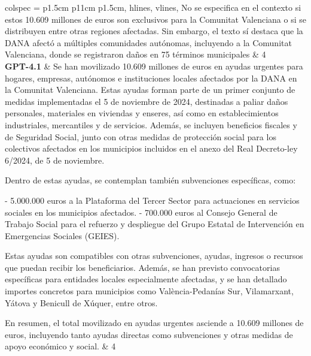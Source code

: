\begin{table}[H]
\begin{tblr}{
    				colspec = {p{1.5cm} p{11cm} p{1.5cm}},
    				hlines,
    				vlines,
    			}
    			 No se especifica en el contexto si estos 10.609 millones de euros son exclusivos para la Comunitat Valenciana o si se distribuyen entre otras regiones afectadas. Sin embargo, el texto sí destaca que la DANA afectó a múltiples comunidades autónomas, incluyendo a la Comunitat Valenciana, donde se registraron daños en 75 términos municipales & 4 \\   
    			 \textbf{GPT-4.1} & Se han movilizado 10.609 millones de euros en ayudas urgentes para hogares, empresas, autónomos e instituciones locales afectados por la DANA en la Comunitat Valenciana. Estas ayudas forman parte de un primer conjunto de medidas implementadas el 5 de noviembre de 2024, destinadas a paliar daños personales, materiales en viviendas y enseres, así como en establecimientos industriales, mercantiles y de servicios. Además, se incluyen beneficios fiscales y de Seguridad Social, junto con otras medidas de protección social para los colectivos afectados en los municipios incluidos en el anexo del Real Decreto-ley 6/2024, de 5 de noviembre.
    			 
    			 Dentro de estas ayudas, se contemplan también subvenciones específicas, como:
    			 
    			 - 5.000.000 euros a la Plataforma del Tercer Sector para actuaciones en servicios sociales en los municipios afectados.
    			 - 700.000 euros al Consejo General de Trabajo Social para el refuerzo y despliegue del Grupo Estatal de Intervención en Emergencias Sociales (GEIES).
    			 
    			 Estas ayudas son compatibles con otras subvenciones, ayudas, ingresos o recursos que puedan recibir los beneficiarios. Además, se han previsto convocatorias específicas para entidades locales especialmente afectadas, y se han detallado importes concretos para municipios como València-Pedanías Sur, Vilamarxant, Yátova y Benicull de Xúquer, entre otros.
    			 
    			 En resumen, el total movilizado en ayudas urgentes asciende a 10.609 millones de euros, incluyendo tanto ayudas directas como subvenciones y otras medidas de apoyo económico y social. & 4 \\       			 		    			
    		\end{tblr}
    		\caption{Comparativa de respuestas a pregunta 1}
    		\label{tab:evo_preg1}
    	\end{table} 
    	
